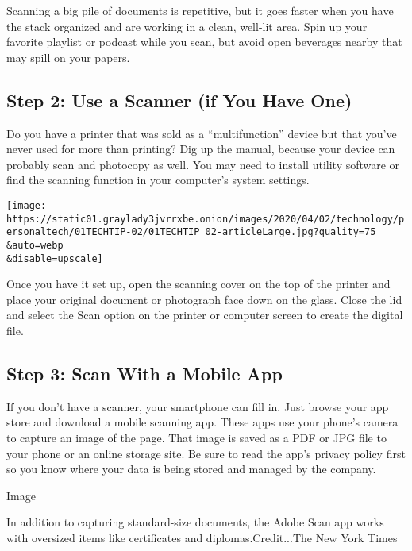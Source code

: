 Scanning a big pile of documents is repetitive, but it goes faster when
you have the stack organized and are working in a clean, well-lit area.
Spin up your favorite playlist or podcast while you scan, but avoid open
beverages nearby that may spill on your papers.

\hypertarget{step-2-use-a-scanner-if-you-have-one}{%
\subsection{Step 2: Use a Scanner (if You Have
One)}\label{step-2-use-a-scanner-if-you-have-one}}

Do you have a printer that was sold as a ``multifunction'' device but
that you've never used for more than printing? Dig up the manual,
because your device can probably scan and photocopy as well. You may
need to install utility software or find the scanning function in your
computer's system settings.

\texttt{[image: https://static01.graylady3jvrrxbe.onion/images/2020/04/02/technology/personaltech/01TECHTIP-02/01TECHTIP\_02-articleLarge.jpg?quality=75\\\&auto=webp\\\&disable=upscale]}

Once you have it set up, open the scanning cover on the top of the
printer and place your original document or photograph face down on the
glass. Close the lid and select the Scan option on the printer or
computer screen to create the digital file.

\hypertarget{step-3-scan-with-a-mobile-app}{%
\subsection{Step 3: Scan With a Mobile
App}\label{step-3-scan-with-a-mobile-app}}

If you don't have a scanner, your smartphone can fill in. Just browse
your app store and download a mobile scanning app. These apps use your
phone's camera to capture an image of the page. That image is saved as a
PDF or JPG file to your phone or an online storage site. Be sure to read
the app's privacy policy first so you know where your data is being
stored and managed by the company.

Image

In addition to capturing standard-size documents, the Adobe Scan app
works with oversized items like certificates and diplomas.Credit...The
New York Times


